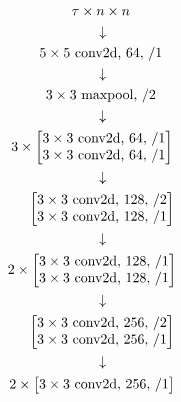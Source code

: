     \begin{gather*}
        \hphantom{3 \times} \tau \times n \times n \\
        \hphantom{3 \times} \downarrow\\
        \hphantom{3 \times} 5 \times 5 \text{ conv2d, } 64, \, /1\\
        \hphantom{3 \times}\downarrow\\
        \hphantom{3 \times} 3 \times 3 \text{ maxpool, } /2\\
        \hphantom{3 \times} \downarrow\\
        3 \times 
        \begin{bmatrix}
            3 \times 3 \text{ conv2d, } 64, \, /1\\
            3 \times 3 \text{ conv2d, } 64, \, /1\\
        \end{bmatrix}\\
        \hphantom{3 \times} \downarrow\\
        \hphantom{3 \times} \begin{bmatrix}
            3 \times 3 \text{ conv2d, } 128, \, /2\\
            3 \times 3 \text{ conv2d, } 128, \, /1\\
        \end{bmatrix}\\
        \hphantom{3 \times} \downarrow\\
        2 \times 
        \begin{bmatrix}
            3 \times 3 \text{ conv2d, } 128, \, /1\\
            3 \times 3 \text{ conv2d, } 128, \, /1\\
        \end{bmatrix}\\
        \hphantom{3 \times} \downarrow\\
        \hphantom{3 \times}
        \begin{bmatrix}
            3 \times 3 \text{ conv2d, } 256, \, /2\\
            3 \times 3 \text{ conv2d, } 256, \, /1\\
        \end{bmatrix}\\
        \hphantom{3 \times} \downarrow\\
        2 \times 
        \begin{bmatrix}
            3 \times 3 \text{ conv2d, } 256, \, /1\\

\end{bmatrix}
\end{gather*}
